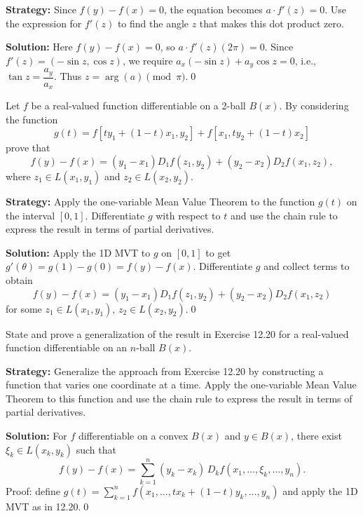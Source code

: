 \noindent\textbf{Strategy:} Since \( f(y) - f(x) = 0 \), the equation becomes \( a \cdot f'(z) = 0 \). Use the expression for \( f'(z) \) to find the angle \( z \) that makes this dot product zero.

\bigskip\noindent\textbf{Solution:}
Here $f(y)-f(x)=0$, so $a\cdot f'(z)(2\pi)=0$. Since $f'(z)=(-\sin z,\cos z)$, we require $a_x(-\sin z)+a_y\cos z=0$, i.e., $\tan z=\dfrac{a_y}{a_x}$. Thus $z=\arg(a)\pmod{\pi}$.\qed


\begin{problembox}
\begin{problemstatement}
Let \( f \) be a real-valued function differentiable on a 2-ball \( B(x) \). By considering the function
\[g(t) = f[ty_1 + (1 - t)x_1, y_2] + f[x_1, ty_2 + (1 - t)x_2]\]
prove that
\[f(y) - f(x) = (y_1 - x_1)D_1f(z_1, y_2) + (y_2 - x_2)D_2f(x_1, z_2),\]
where \( z_1 \in L(x_1, y_1) \) and \( z_2 \in L(x_2, y_2) \).
\end{problemstatement}
\end{problembox}

\noindent\textbf{Strategy:} Apply the one-variable Mean Value Theorem to the function \( g(t) \) on the interval \( [0,1] \). Differentiate \( g \) with respect to \( t \) and use the chain rule to express the result in terms of partial derivatives.

\bigskip\noindent\textbf{Solution:}
Apply the 1D MVT to $g$ on $[0,1]$ to get $g'(\theta)=g(1)-g(0)=f(y)-f(x)$. Differentiate $g$ and collect terms to obtain
\[f(y)-f(x)=(y_1-x_1)D_1 f(z_1,y_2)+(y_2-x_2)D_2 f(x_1,z_2)\]
for some $z_1\in L(x_1,y_1)$, $z_2\in L(x_2,y_2)$.\qed


\begin{problembox}
\begin{problemstatement}
State and prove a generalization of the result in Exercise 12.20 for a real-valued function differentiable on an \( n \)-ball \( B(x) \).
\end{problemstatement}
\end{problembox}

\noindent\textbf{Strategy:} Generalize the approach from Exercise 12.20 by constructing a function that varies one coordinate at a time. Apply the one-variable Mean Value Theorem to this function and use the chain rule to express the result in terms of partial derivatives.

\bigskip\noindent\textbf{Solution:}
For $f$ differentiable on a convex $B(x)$ and $y\in B(x)$, there exist $\xi_k\in L(x_k,y_k)$ such that
\[f(y)-f(x)=\sum_{k=1}^n (y_k-x_k)\,D_k f(x_1,\dots,\xi_k,\dots,y_n).\]
Proof: define $g(t)=\sum_{k=1}^n f(x_1,\dots,tx_k+(1-t)y_k,\dots,y_n)$ and apply the 1D MVT as in 12.20.\qed


